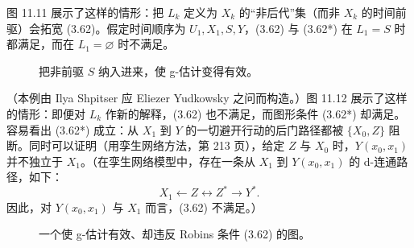 \begin{example}\label{ex:11.3.2}
图 11.11 展示了这样的情形：把 $L_k$ 定义为 $X_k$ 的“非后代”集（而非 $X_k$ 的时间前驱）会拓宽 (3.62)。假定时间顺序为 $U_1,X_1,S,Y$，(3.62) 与 (3.62*) 在 $L_1=S$ 时都满足，而在 $L_1=\varnothing$ 时不满足。
\end{example}

\begin{figure}[htbp]
\centering
{}
\caption{把非前驱 $S$ 纳入进来，使 g-估计变得有效。}
\label{fig:11.11}
\end{figure}

\begin{example}\label{ex:11.3.3}
（本例由 Ilya Shpitser 应 Eliezer Yudkowsky 之问而构造。）图 11.12 展示了这样的情形：即便对 $L_k$ 作新的解释，(3.62) 也不满足，而图形条件 (3.62*) 却满足。容易看出 (3.62*) 成立：从 $X_1$ 到 $Y$ 的一切避开行动的后门路径都被 $\{X_0,Z\}$ 阻断。同时可以证明（用孪生网络方法，第 213 页），给定 $Z$ 与 $X_0$ 时，$Y(x_0,x_1)$ 并不独立于 $X_1$。（在孪生网络模型中，存在一条从 $X_1$ 到 $Y(x_0,x_1)$ 的 d-连通路径，如下：
\[
X_1\leftarrow Z\leftrightarrow Z^*\to Y^*.
\]
因此，对 $Y(x_0,x_1)$ 与 $X_1$ 而言，(3.62) 不满足。）
\end{example}

\begin{figure}[htbp]
\centering
{}
\caption{一个使 g-估计有效、却违反 Robins 条件 (3.62) 的图。}
\label{fig:11.12}
\end{figure}

